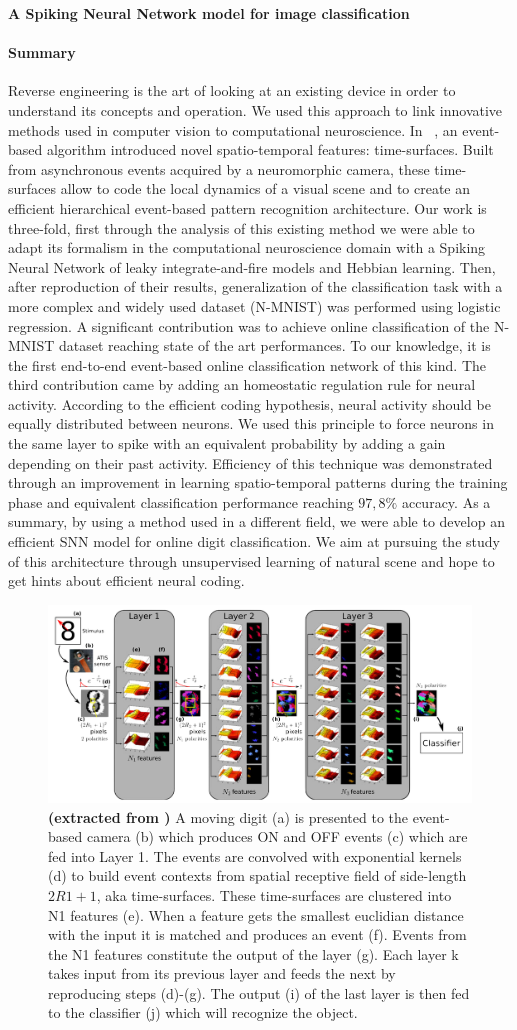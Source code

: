 \documentclass[12pt]{article}
\newcommand{\citet}[1]{\textcite{#1}}
\newcommand{\Summary}{
Reverse engineering is the art of looking at an existing device in order to understand its concepts and operation. We used this approach to link innovative methods used in computer vision to computational neuroscience. In ~\citet{lagorce2016hots}, an event-based algorithm introduced novel spatio-temporal features: time-surfaces. Built from asynchronous events acquired by a neuromorphic camera, these time-surfaces allow to code the local dynamics of a visual scene and to create an efficient hierarchical event-based pattern recognition architecture. Our work is three-fold, first through the analysis of this existing method we were able to adapt its formalism in the computational neuroscience domain with a Spiking Neural Network of leaky integrate-and-fire models and Hebbian learning. Then, after reproduction of their results, generalization of the classification task with a more complex and widely used dataset (N-MNIST) was performed using logistic regression. A significant contribution was to achieve online classification of the N-MNIST dataset reaching state of the art performances. To our knowledge, it is the first end-to-end event-based online classification network of this kind. The third contribution came by adding an homeostatic regulation rule for neural activity. According to the efficient coding hypothesis, neural activity should be equally distributed between neurons. We used this principle to force neurons in the same layer to spike with an equivalent probability by adding a gain depending on their past activity. Efficiency of this technique was demonstrated through an improvement in learning spatio-temporal patterns during the training phase and equivalent classification performance reaching $97,8\%$ accuracy. As a summary, by using a method used in a different field, we were able to develop an efficient SNN model for online digit classification. We aim at pursuing the study of this architecture through unsupervised learning of natural scene and hope to get hints about efficient neural coding.
}
\begin{document}
{\Large\bf
A Spiking Neural Network model for image classification
}


\paragraph*{Summary}
\Summary

\begin{figure}[!ht]%
\includegraphics[width=.99\linewidth]{../notebooks/fig/hots.png}
\caption
{
\textbf{(extracted from \cite{lagorce2016hots}) } A moving digit (a) is presented to the event-based camera (b) which produces ON and OFF events (c) which are fed into Layer 1. The events are convolved with exponential kernels (d) to build event contexts from spatial receptive field of side-length $2R1+1$, aka time-surfaces. These time-surfaces are clustered into N1 features (e). When a feature gets the smallest euclidian distance with the input it is matched and produces an event (f). Events from the N1 features constitute the output of the layer (g). Each layer k takes input from its previous layer and feeds the next by reproducing steps (d)-(g). The output (i) of the last layer is then fed to the classifier (j) which will recognize the object.
\label{fig:fig1}
}
\end{figure}
\end{document}
